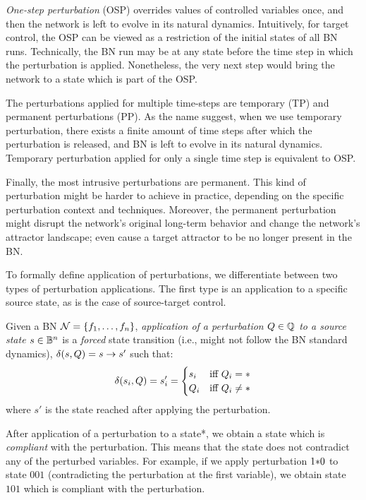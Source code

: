 \emph{One-step perturbation} (OSP) overrides values of controlled variables once, and then the network is left to evolve in its natural dynamics. Intuitively, for target control, the OSP can be viewed as a restriction of the initial states of all BN runs. Technically, the BN run may be at any state before the time step in which the perturbation is applied. Nonetheless, the very next step would bring the network to a state which is part of the OSP.

The perturbations applied for multiple time-steps are temporary (TP) and permanent perturbations (PP). As the name suggest, when we use temporary perturbation, there exists a finite amount of time steps after which the perturbation is released, and BN is left to evolve in its natural dynamics. Temporary perturbation applied for only a single time step is equivalent to OSP. 

Finally, the most intrusive perturbations are permanent. This kind of perturbation might be harder to achieve in practice, depending on the specific perturbation context and techniques. Moreover, the permanent perturbation might disrupt the network's original long-term behavior and change the network's attractor landscape; even cause a target attractor to be no longer present in the BN.

To formally define application of perturbations, we differentiate between two types of perturbation applications. The first type is an application to a specific source state, as is the case of source-target control.

\begin{definition}
    \label{def:perturbation_application}
    Given a BN $\mathcal{N} = \{f_1, \ldots, f_n\}$, \emph{application of a perturbation $Q \in \mathbb{Q}$ to a source state $s \in \mathbb{B}^n$} is a \emph{forced} state transition (i.e., might not follow the BN standard dynamics), $\delta(s, Q) = s \to s'$ such that: 
    $$\delta(s_i, Q) = s'_i = \begin{cases}
        s_i & \text{iff } Q_i = {*} \\
        Q_i & \text{iff } Q_i \neq {*}
    \end{cases}$$
    where $s'$ is the state reached after applying the perturbation.
\end{definition}

After application of a perturbation to a state*, we obtain a state which is \emph{compliant} with the perturbation. This means that the state does not contradict any of the perturbed variables. For example, if we apply perturbation $1{*}0$ to state $001$ (contradicting the perturbation at the first variable), we obtain state $101$ which is compliant with the perturbation.

